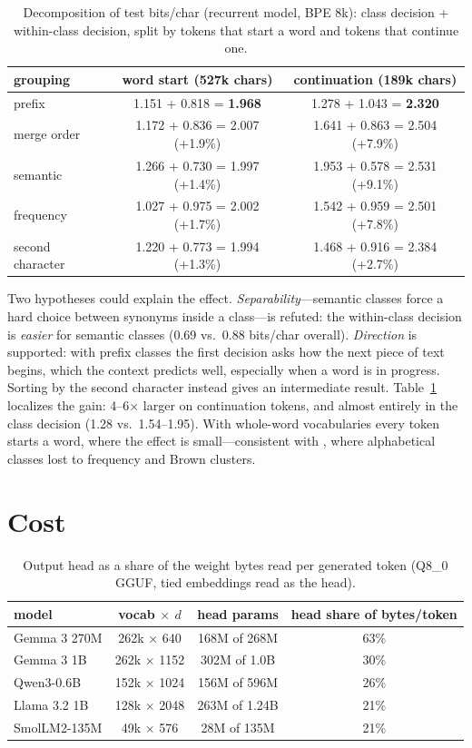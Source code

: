 \documentclass[11pt]{article}
\begin{document}
\begin{table}[t]
\centering
\caption{Decomposition of test bits/char (recurrent model, BPE 8k): class decision + within-class decision, split by tokens that start a word and tokens that continue one.}
\label{tab:split}
\begin{tabular}{lcc}
\toprule
grouping & word start (527k chars) & continuation (189k chars) \\
\midrule
prefix & 1.151 + 0.818 = \textbf{1.968} & 1.278 + 1.043 = \textbf{2.320} \\
merge order & 1.172 + 0.836 = 2.007 (+1.9\%) & 1.641 + 0.863 = 2.504 (+7.9\%) \\
semantic & 1.266 + 0.730 = 1.997 (+1.4\%) & 1.953 + 0.578 = 2.531 (+9.1\%) \\
frequency & 1.027 + 0.975 = 2.002 (+1.7\%) & 1.542 + 0.959 = 2.501 (+7.8\%) \\
second character & 1.220 + 0.773 = 1.994 (+1.3\%) & 1.468 + 0.916 = 2.384 (+2.7\%) \\
\bottomrule
\end{tabular}
\end{table}

Two hypotheses could explain the effect. \emph{Separability}---semantic classes force a hard choice between synonyms inside a class---is refuted: the within-class decision is \emph{easier} for semantic classes (0.69 vs.\ 0.88 bits/char overall). \emph{Direction} is supported: with prefix classes the first decision asks how the next piece of text begins, which the context predicts well, especially when a word is in progress. Sorting by the second character instead gives an intermediate result. Table~\ref{tab:split} localizes the gain: 4--6$\times$ larger on continuation tokens, and almost entirely in the class decision (1.28 vs.\ 1.54--1.95). With whole-word vocabularies every token starts a word, where the effect is small---consistent with \citet{jiang2017}, where alphabetical classes lost to frequency and Brown clusters.

\section{Cost}\label{sec:cost}

\begin{table}[t]
\centering
\caption{Output head as a share of the weight bytes read per generated token (Q8\_0 GGUF, tied embeddings read as the head).}
\label{tab:share}
\begin{tabular}{lccc}
\toprule
model & vocab $\times$ $d$ & head params & head share of bytes/token \\
\midrule
Gemma 3 270M & 262k $\times$ 640 & 168M of 268M & 63\% \\
Gemma 3 1B & 262k $\times$ 1152 & 302M of 1.0B & 30\% \\
Qwen3-0.6B & 152k $\times$ 1024 & 156M of 596M & 26\% \\
Llama 3.2 1B & 128k $\times$ 2048 & 263M of 1.24B & 21\% \\
SmolLM2-135M & 49k $\times$ 576 & 28M of 135M & 21\% \\
\bottomrule
\end{tabular}
\end{table}
\end{document}

